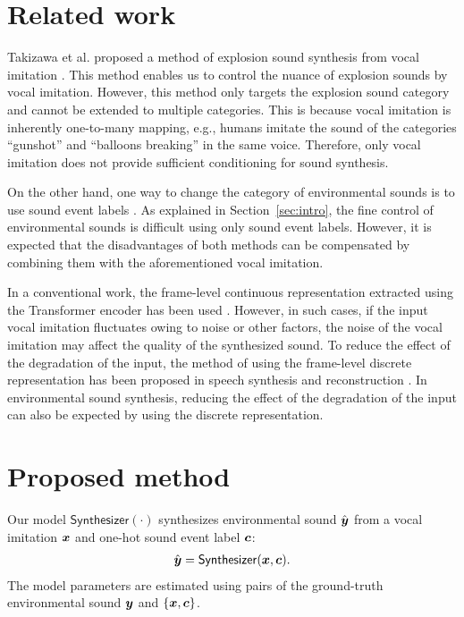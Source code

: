 \documentclass{article}
\newcommand{\bmit}[1]{{\mbox{\boldmath $#1$}}}
\begin{document}
\vspace{-3pt}
\section{Related work}
\vspace{-3pt}
\label{sec:related_work}
Takizawa et al. proposed a method of explosion sound synthesis from vocal imitation \cite{Takizawa_IUI_2023}.
This method enables us to control the nuance of explosion sounds by vocal imitation.
However, this method only targets the explosion sound category and cannot be extended to multiple categories. 
This is because vocal imitation is inherently one-to-many mapping, e.g., humans imitate the sound of the categories ``gunshot'' and ``balloons breaking'' in the same voice.
Therefore, only vocal imitation does not provide sufficient conditioning for sound synthesis.

On the other hand, one way to change the category of environmental sounds is to use sound event labels \cite{Kong_ICASSP2019,Liu_MLSP_2021}.
As explained in Section~\ref{sec:intro}, the fine control of environmental sounds is difficult using only sound event labels. 
However, it is expected that the disadvantages of both methods can be compensated by combining them with the aforementioned vocal imitation.

In a conventional work, the frame-level continuous representation extracted using the Transformer encoder has been used \cite{Takizawa_IUI_2023}.
However, in such cases, if the input vocal imitation fluctuates owing to noise or other factors, the noise of the vocal imitation may affect the quality of the synthesized sound.
To reduce the effect of the degradation of the input, the method of using the frame-level discrete representation has been proposed in speech synthesis and reconstruction \cite{Park_INTERSPEECH_2023}.
In environmental sound synthesis, reducing the effect of the degradation of the input can also be expected by using the discrete representation.

\vspace{-2pt}
\section{Proposed method}
\vspace{-2pt}
\label{sec:proposed_method}
Our model $\mathsf{Synthesizer}(\cdot)$ synthesizes environmental sound $\hat{{\bmit y}}$ from a vocal imitation ${\bmit x}$ and one-hot sound event label ${\bmit c}$:
\begin{align}
    \hat{{\bmit y}} = \mathsf{Synthesizer}({\bmit x}, {\bmit c}).
    \label{eq:train}
\end{align}
The model parameters are estimated using pairs of the ground-truth environmental sound ${\bmit y}$ and $\{{\bmit x}, {\bmit c}\}$.
\end{document}
